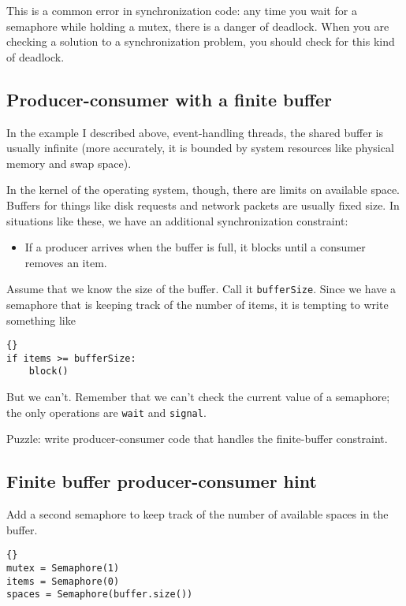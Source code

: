 \documentclass{book}
\newcommand{\clearemptydoublepage}{\newpage\cleardoublepage}
\begin{document}
This is a common error in synchronization code: any time
you wait for a semaphore while holding a mutex, there is
a danger of deadlock.  When you are checking a solution to
a synchronization problem, you should check for this kind
of deadlock.


\subsection{Producer-consumer with a finite buffer}

In the example I described above, event-handling threads,
the shared buffer is usually infinite (more accurately, it is
bounded by system resources like physical memory and swap
space).

In the kernel of the operating system, though, there are
limits on available space.  Buffers for things like disk
requests and network packets are usually fixed size.  In
situations like these, we have an additional synchronization
constraint:

\begin{itemize}

\item If a producer arrives when the buffer is full, it
blocks until a consumer removes an item.

\end{itemize}

Assume that we know the size of the buffer.  Call it
{\tt bufferSize}.  Since we have a semaphore that is keeping
track of the number of items, it is tempting to write something
like 

\begin{lstlisting}[title={Broken finite buffer solution}]{}
if items >= bufferSize:
    block()
\end{lstlisting}

But we can't.  Remember that we can't check the current
value of a semaphore; the only operations are {\tt wait}
and {\tt signal}.

Puzzle: write producer-consumer code that handles the finite-buffer
constraint.

\clearemptydoublepage
\subsection{Finite buffer producer-consumer hint}

Add a second semaphore to keep track of the number of
available spaces in the buffer.

\begin{lstlisting}[title={Finite-buffer producer-consumer initialization}]{}
mutex = Semaphore(1)
items = Semaphore(0)
spaces = Semaphore(buffer.size())
\end{lstlisting}
\end{document}
